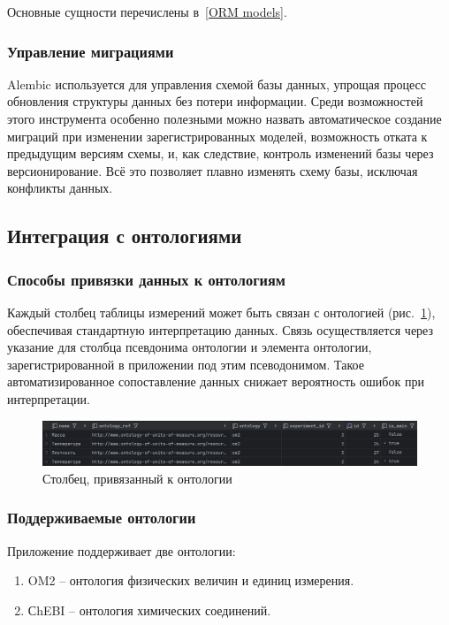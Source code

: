 Основные сущности перечислены в~\ref{ORM models}.

\subsubsection{Управление миграциями}

Alembic используется для управления схемой базы данных, упрощая процесс обновления структуры данных без потери информации. Среди возможностей этого инструмента особенно полезными можно назвать автоматическое создание миграций при изменении зарегистрированных моделей, возможность отката к предыдущим версиям схемы, и, как следствие, контроль изменений базы через версионирование. Всё это позволяет плавно изменять схему базы, исключая конфликты данных.

\subsection{Интеграция с онтологиями}

\subsubsection{Способы привязки данных к онтологиям}

Каждый столбец таблицы измерений может быть связан с онтологией (рис.~\ref{pic:linked_to_ontology_column}), обеспечивая стандартную интерпретацию данных.
Связь осуществляется через указание для столбца псевдонима онтологии и элемента онтологии, зарегистрированной в приложении под этим псеводонимом.
Такое автоматизированное сопоставление данных снижает вероятность ошибок при интерпретации.

\begin{figure}[H]
    \centering
    \includegraphics[width=\linewidth]{img/ontology_linking.png}
    \caption{Столбец, привязанный к онтологии}
    \label{pic:linked_to_ontology_column}
\end{figure}
\vspace{0.5cm}

\subsubsection{Поддерживаемые онтологии}

Приложение поддерживает две онтологии:
\begin{enumerate}
    \item OM2 -- онтология физических величин и единиц измерения.
    \item СhEBI -- онтология химических соединений.
\end{enumerate}

